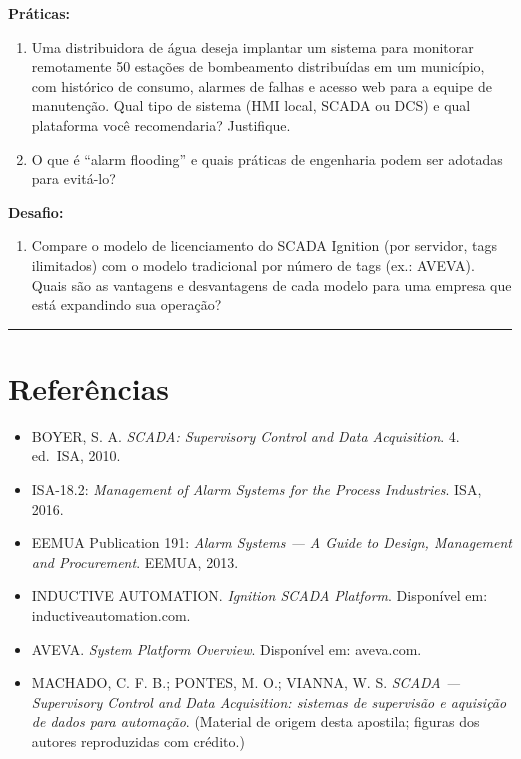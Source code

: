 \textbf{Práticas:}

\begin{enumerate}
\def\labelenumi{\arabic{enumi}.}
\setcounter{enumi}{3}
\tightlist
\item
  Uma distribuidora de água deseja implantar um sistema para monitorar remotamente 50 estações de bombeamento distribuídas em um município, com histórico de consumo, alarmes de falhas e acesso web para a equipe de manutenção. Qual tipo de sistema (HMI local, SCADA ou DCS) e qual plataforma você recomendaria? Justifique.
\item
  O que é ``alarm flooding'' e quais práticas de engenharia podem ser adotadas para evitá-lo?
\end{enumerate}

\textbf{Desafio:}

\begin{enumerate}
\def\labelenumi{\arabic{enumi}.}
\setcounter{enumi}{5}
\tightlist
\item
  Compare o modelo de licenciamento do SCADA Ignition (por servidor, tags ilimitados) com o modelo tradicional por número de tags (ex.: AVEVA). Quais são as vantagens e desvantagens de cada modelo para uma empresa que está expandindo sua operação?
\end{enumerate}

\begin{center}\rule{0.5\linewidth}{0.5pt}\end{center}

\section{Referências}\label{referuxeancias}

\begin{itemize}
\tightlist
\item
  BOYER, S. A. \emph{SCADA: Supervisory Control and Data Acquisition}. 4. ed.~ISA, 2010.
\item
  ISA-18.2: \emph{Management of Alarm Systems for the Process Industries}. ISA, 2016.
\item
  EEMUA Publication 191: \emph{Alarm Systems --- A Guide to Design, Management and Procurement}. EEMUA, 2013.
\item
  INDUCTIVE AUTOMATION. \emph{Ignition SCADA Platform}. Disponível em: inductiveautomation.com.
\item
  AVEVA. \emph{System Platform Overview}. Disponível em: aveva.com.
\item
  MACHADO, C. F. B.; PONTES, M. O.; VIANNA, W. S. \emph{SCADA --- Supervisory Control and Data
  Acquisition: sistemas de supervisão e aquisição de dados para automação}. (Material de origem desta
  apostila; figuras dos autores reproduzidas com crédito.)
\end{itemize}
